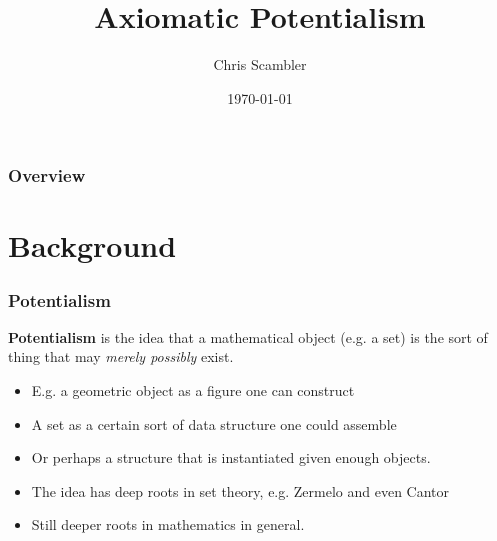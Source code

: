 \documentclass{beamer}
\title[Axiomatic Potentialism]{Axiomatic Potentialism}
\author{Chris Scambler}
\institute[ASC] 
{
All Souls College, \\
Oxford University \\ 
\medskip
\textit{chris.scambler@all-souls.ox.ac.uk} 
}
\date{\today}
\begin{document}
\begin{frame}
\titlepage 
\end{frame}

\begin{frame}
\frametitle{Overview} 
\tableofcontents 
\end{frame}
\section{Background}

\begin{frame}
\frametitle{Potentialism}
\begin{block}
    {\bf Potentialism} is the idea that a mathematical object (e.g. a set) is the sort 
    of thing that may \emph{merely possibly} exist.
\end{block}
\begin{itemize}
    \item<3-> E.g. a geometric object as a figure one can construct
    \item<4-> A set as a certain sort of data structure one could assemble
    \item<5-> Or perhaps a structure that is instantiated given enough objects.
    \item<6-> The idea has deep roots in set theory, e.g. Zermelo and even Cantor
    \item<7-> Still deeper roots in mathematics in general.
\end{itemize}
\end{frame}
\end{document}
